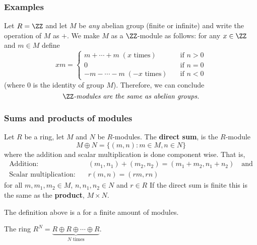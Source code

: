 \documentclass[12pt, a4paper]{article}
\begin{document}
\subsubsection{Examples}

\begin{mdexample}[\(\ZZ\)-modules]
    Let \(R=\ZZ\) and let \(M\) be \textit{any} abelian group (finite or infinite) and write the operation of \(M\) as \(+\).
    We make \(M\) as a \(\ZZ\)-module as follows: for any \(x \in \ZZ\) and \(m \in M\) define 
    \[xm = \begin{cases}
        m+\cdots+m \; (x \text{ times}) &\quad \text{if } n > 0\\
        0 &\quad \text{if } n =0 \\
        -m-\cdots-m \; (-x \text{ times}) &\quad \text{if } n < 0
    \end{cases}\]
    (where \(0\) is the identity of group \(M\)). Therefore, we can conclude 
    \[\ZZ\textit{-modules are the same as abelian groups.}\]
\end{mdexample}

\subsubsection{Sums and products of modules}

\begin{definition}
    Let \(R\) be a ring, let \(M\) and \(N\) be \(R\)-modules. The \textbf{direct sum}, is the \(R\)-module 
    \[M \oplus N  = \{(m,n) : m \in M, n\in N\}\]
    where the addition and scalar multiplication is done component wise. That is, 
    \[\begin{aligned}
        \text{Addition:} &\quad (m_1,n_1)+(m_2,n_2) = (m_1+m_2,n_1+n_2) \quad \text{and}\\
        \text{Scalar multiplication:} &\quad r(m,n)=(rm,rn)
    \end{aligned}\]
    for all \(m,m_1,m_2 \in M\), \(n,n_1,n_2 \in N\) and \(r \in R\)
    If the direct sum is finite this is the same as the \textbf{product}, \(M \times N\).
\end{definition}

\begin{mdremark}
    The definition above is a for a finite amount of modules.
\end{mdremark}

\begin{mdexample}
    The ring \(R^N = \underbrace{R\oplus R \oplus \cdots \oplus R}_{N \text{ times}}.\)
\end{mdexample}
\end{document}
